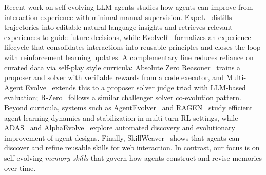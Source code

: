 Recent work on self-evolving LLM agents studies how agents can improve from interaction experience with minimal manual supervision. 
ExpeL~\citep{zhao2024expel} distills trajectories into editable natural-language insights and retrieves relevant experiences to guide future decisions, while EvolveR~\citep{wu2025evolver} formalizes an experience lifecycle that consolidates interactions into reusable principles and closes the loop with reinforcement learning updates. 
A complementary line reduces reliance on curated data via self-play style curricula: Absolute Zero Reasoner~\citep{zhao2025absolute} trains a proposer and solver with verifiable rewards from a code executor, and Multi-Agent Evolve~\citep{chen2025multi} extends this to a proposer solver judge triad with LLM-based evaluation; R-Zero~\citep{huang2025r} follows a similar challenger solver co-evolution pattern. 
Beyond curricula, systems such as AgentEvolver~\citep{zhai2025agentevolver} and RAGEN~\citep{wang2025ragen} study efficient agent learning dynamics and stabilization in multi-turn RL settings, while ADAS~\citep{hu2024automated} and AlphaEvolve~\citep{novikov2025alphaevolve} explore automated discovery and evolutionary improvement of agent designs. Finally, SkillWeaver~\citep{zheng2025skillweaver} shows that agents can discover and refine reusable skills for web interaction. In contrast, our focus is on self-evolving \emph{memory skills} that govern how agents construct and revise memories over time.





